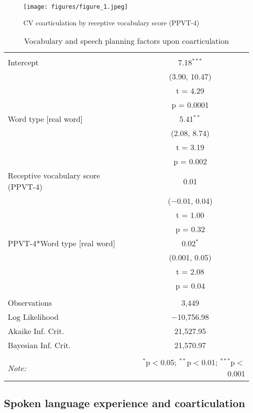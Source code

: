 \documentclass[a4paper,man,natbib,donotrepeattitle, apacite]{apa6}
\begin{document}
\begin{figure}[H]
\centering
\texttt{[image: figures/figure\_1.jpeg]}
\caption{\label{fig:figure-1}CV coarticulation by receptive vocabulary score (PPVT-4)}
\end{figure}


\begin{table}[!htbp] \centering 
  \caption{Vocabulary and speech planning factors upon coarticulation} 
  \label{tab:model-1} 
\begin{tabular}{@{\extracolsep{5pt}}lc} 
\\[-1.8ex]\hline 
\hline \\[-1.8ex] 
 Intercept & 7.18$^{***}$ \\ 
  & (3.90, 10.47) \\ 
  & t = 4.29 \\ 
  & p = 0.0001 \\ 
  Word type [real word] & 5.41$^{**}$ \\ 
  & (2.08, 8.74) \\ 
  & t = 3.19 \\ 
  & p = 0.002 \\ 
  Receptive vocabulary score (PPVT-4) & 0.01 \\ 
  & ($-$0.01, 0.04) \\ 
  & t = 1.00 \\ 
  & p = 0.32 \\ 
  PPVT-4*Word type [real word] & 0.02$^{*}$ \\ 
  & (0.001, 0.05) \\ 
  & t = 2.08 \\ 
  & p = 0.04 \\ 
 \hline \\[-1.8ex] 
Observations & 3,449 \\ 
Log Likelihood & $-$10,756.98 \\ 
Akaike Inf. Crit. & 21,527.95 \\ 
Bayesian Inf. Crit. & 21,570.97 \\ 
\hline 
\hline \\[-1.8ex] 
\textit{Note:}  & \multicolumn{1}{r}{$^{*}$p$<$0.05; $^{**}$p$<$0.01; $^{***}$p$<$0.001} \\ 
\end{tabular} 
\end{table} 


\subsection{Spoken language experience and coarticulation}
\end{document}
